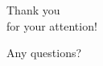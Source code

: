 \documentclass[18pt]{beamer}
\begin{document}
\begin{frame}{}
\Huge
\begin{center}
\textcolor{kit-green100}{Thank you\\for your attention!}

\vspace{1em}
\Large
Any questions?
\end{center}
\end{frame}

%
%
\end{document}
